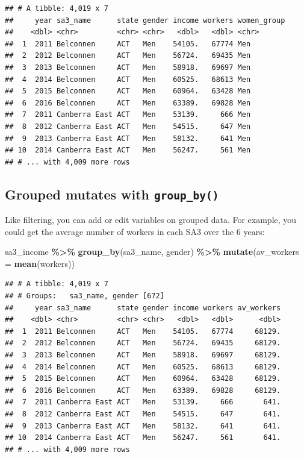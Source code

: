 \documentclass[
]{book}
\newenvironment{Shaded}{\begin{snugshade}}{\end{snugshade}}
\newcommand{\DataTypeTok}[1]{\textcolor[rgb]{0.13,0.29,0.53}{#1}}
\newcommand{\KeywordTok}[1]{\textcolor[rgb]{0.13,0.29,0.53}{\textbf{#1}}}
\newcommand{\NormalTok}[1]{#1}
\newcommand{\OperatorTok}[1]{\textcolor[rgb]{0.81,0.36,0.00}{\textbf{#1}}}
\newcommand{\StringTok}[1]{\textcolor[rgb]{0.31,0.60,0.02}{#1}}
\begin{document}
\begin{verbatim}
## # A tibble: 4,019 x 7
##     year sa3_name      state gender income workers women_group
##    <dbl> <chr>         <chr> <chr>   <dbl>   <dbl> <chr>      
##  1  2011 Belconnen     ACT   Men    54105.   67774 Men        
##  2  2012 Belconnen     ACT   Men    56724.   69435 Men        
##  3  2013 Belconnen     ACT   Men    58918.   69697 Men        
##  4  2014 Belconnen     ACT   Men    60525.   68613 Men        
##  5  2015 Belconnen     ACT   Men    60964.   63428 Men        
##  6  2016 Belconnen     ACT   Men    63389.   69828 Men        
##  7  2011 Canberra East ACT   Men    53139.     666 Men        
##  8  2012 Canberra East ACT   Men    54515.     647 Men        
##  9  2013 Canberra East ACT   Men    58132.     641 Men        
## 10  2014 Canberra East ACT   Men    56247.     561 Men        
## # ... with 4,009 more rows
\end{verbatim}

\hypertarget{grouped-mutates-with-group_by}{%
\subsection{\texorpdfstring{Grouped mutates with \texttt{group\_by()}}{Grouped mutates with group\_by()}}\label{grouped-mutates-with-group_by}}

Like filtering, you can add or edit variables on grouped data. For example, you could get the average number of workers in each SA3 over the 6 years:

\begin{Shaded}
\begin{Highlighting}[]
\NormalTok{sa3\_income }\OperatorTok{\%\textgreater{}\%}\StringTok{ }
\StringTok{  }\KeywordTok{group\_by}\NormalTok{(sa3\_name, gender) }\OperatorTok{\%\textgreater{}\%}\StringTok{ }
\StringTok{  }\KeywordTok{mutate}\NormalTok{(}\DataTypeTok{av\_workers =} \KeywordTok{mean}\NormalTok{(workers))}
\end{Highlighting}
\end{Shaded}

\begin{verbatim}
## # A tibble: 4,019 x 7
## # Groups:   sa3_name, gender [672]
##     year sa3_name      state gender income workers av_workers
##    <dbl> <chr>         <chr> <chr>   <dbl>   <dbl>      <dbl>
##  1  2011 Belconnen     ACT   Men    54105.   67774     68129.
##  2  2012 Belconnen     ACT   Men    56724.   69435     68129.
##  3  2013 Belconnen     ACT   Men    58918.   69697     68129.
##  4  2014 Belconnen     ACT   Men    60525.   68613     68129.
##  5  2015 Belconnen     ACT   Men    60964.   63428     68129.
##  6  2016 Belconnen     ACT   Men    63389.   69828     68129.
##  7  2011 Canberra East ACT   Men    53139.     666       641.
##  8  2012 Canberra East ACT   Men    54515.     647       641.
##  9  2013 Canberra East ACT   Men    58132.     641       641.
## 10  2014 Canberra East ACT   Men    56247.     561       641.
## # ... with 4,009 more rows
\end{verbatim}
\end{document}
